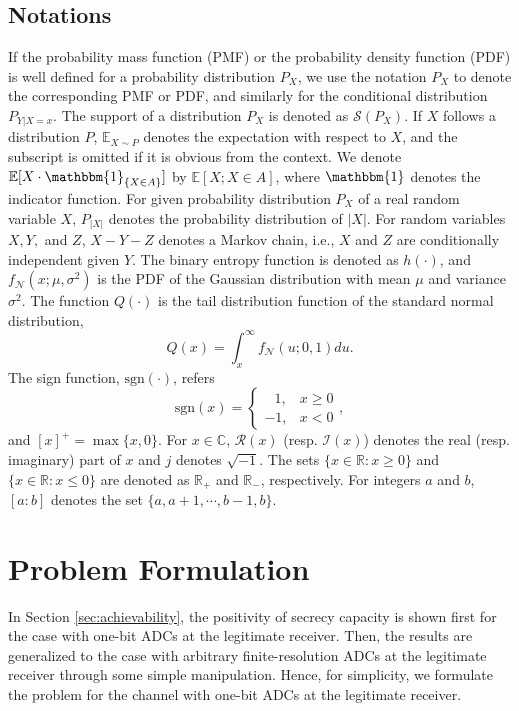 \documentclass[journal]{IEEEtran}
\begin{document}
\subsection{Notations}
If the probability mass function (PMF) or the probability density function (PDF) is well defined for a probability distribution $P_X$, we use the notation $P_X$ to denote the corresponding PMF or PDF, and similarly for the conditional distribution $P_{Y|X=x}$. The support of a distribution $P_X$ is denoted as  $\mathcal{S}(P_X)$.
If $X$ follows a distribution $P$, $\mathbb{E}_{X\sim P}$ denotes the expectation with respect to $X$, and the subscript is omitted if it is obvious from the context. 
We denote $\mathbb{E}[X \cdot \mathbbm{1}_{\{X\in A\}}]$ by $\mathbb{E}[X;X\in A]$, where $\mathbbm{1}$ denotes the indicator function.
For given probability distribution $P_X$ of a real random variable $X$, $P_{|X|}$ denotes the probability distribution of $|X|$. 
For random variables $X,Y,$ and $Z$, ${X-Y-Z}$ denotes a Markov chain, i.e., $X$ and $Z$ are conditionally independent given $Y$.
The binary entropy function is denoted as $h(\cdot)$, and $f_{\mathcal{N}}(x;\mu,\sigma^2)$ is the PDF of the Gaussian distribution with mean $\mu$ and variance $\sigma^2$.
The function $Q(\cdot)$ is the tail distribution function of the standard normal distribution, 
\begin{equation}
    Q(x) = \int_x^\infty f_{\mathcal{N}}(u;0,1) du. \nonumber
\end{equation}
The sign function, $\mathrm{sgn}(\cdot)$, refers
\begin{equation}
    \mathrm{sgn}(x) = \begin{cases} \;\:\: 1, & x \geq 0 \\ -1, & x < 0 \end{cases}, \nonumber
\end{equation}
and $[x]^+=\max\{x,0\}$. For $x \in \mathbb{C}$, $\mathcal{R}(x)$ (resp. $\mathcal{I}(x)$) denotes the real (resp. imaginary) part of $x$ and $j$ denotes $\sqrt{-1}$.
The sets $\{x\in \mathbb{R}:x\geq 0\}$ and $\{x\in \mathbb{R}:x \leq 0\}$ are denoted as $\mathbb{R}_+$ and $\mathbb{R}_-$, respectively. For integers $a$ and $b$, $[a:b]$ denotes the set $\{a,a+1,\cdots,b-1,b\}$.


\section{Problem Formulation}\label{sec:problem_formulation}
In Section \ref{sec:achievability}, the positivity of secrecy capacity is shown first for the case with one-bit ADCs at the legitimate receiver. Then, the results are  generalized to the case with arbitrary finite-resolution ADCs at the legitimate receiver through  some simple manipulation. Hence, for simplicity, we formulate the problem for the channel with one-bit ADCs at the legitimate receiver. 
 
\end{document}
